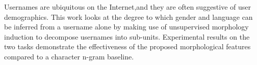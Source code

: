 Usernames are ubiquitous on the Internet,and they are often suggestive of user demographics. This work looks at the degree to which gender and language can be inferred  from a username alone by making use of unsupervised morphology induction to decompose              usernames into sub-units. Experimental results on the two tasks demonstrate the effectiveness of the proposed morphological features compared to a character n-gram baseline.
